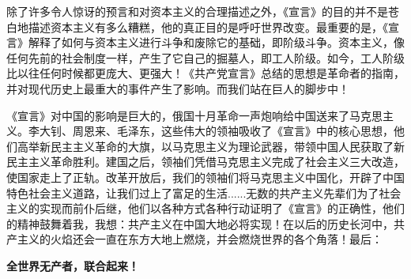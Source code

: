 \documentclass[a4paper,11pt,UTF8]{article}
\begin{document}
除了许多令人惊讶的预言和对资本主义的合理描述之外，《宣言》的目的并不是苍白地描述资本主义有多么糟糕，他的真正目的是呼吁世界改变。最重要的是，《宣言》解释了如何与资本主义进行斗争和废除它的基础，即阶级斗争。资本主义，像任何先前的社会制度一样，产生了它自己的掘墓人，即工人阶级。如今，工人阶级比以往任何时候都更庞大、更强大！《共产党宣言》总结的思想是革命者的指南，并对现代历史上最重大的事件产生了影响。而我们站在巨人的脚步中！

《宣言》对中国的影响是巨大的，俄国十月革命一声炮响给中国送来了马克思主义。李大钊、周恩来、毛泽东，这些伟大的领袖吸收了《宣言》中的核心思想，他们高举新民主主义革命的大旗，以马克思主义为理论武器，带领中国人民获取了新民主主义革命胜利。建国之后，领袖们凭借马克思主义完成了社会主义三大改造，使国家走上了正轨。改革开放后，我们的领袖们将马克思主义中国化，开辟了中国特色社会主义道路，让我们过上了富足的生活......无数的共产主义先辈们为了社会主义的实现而前仆后继，他们以各种方式各种行动证明了《宣言》的正确性，他们的精神鼓舞着我，我想：共产主义在中国大地必将实现！在以后的历史长河中，共产主义的火焰还会一直在东方大地上燃烧，并会燃烧世界的各个角落！最后：

\centering\Huge{\textbf{全世界无产者，联合起来！}}
\end{document}

